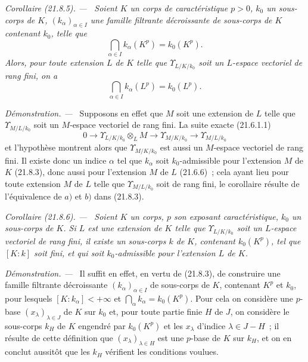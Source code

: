 \documentclass[10pt,oneside]{book}
\makeatletter
\newcommand{\setmanualcurrentlabel}[1]{\def\@currentlabel{#1}}
\newenvironment{corollary}[1][]{%
  \setmanualcurrentlabel{#1}\par\medskip\noindent\itshape Corollaire (#1). ---\ }{\par}
\newenvironment{proof}{%
  \par\medskip\noindent\textit{Démonstration. ---\ }}{\par}
\makeatother
\begin{document}
\begin{corollary}[21.8.5]
\label{0.21.8.5-fr}
Soient $K$ un corps de caractéristique $p>0$, $k_0$ un sous-corps de $K$,
$(k_\alpha)_{\alpha\in I}$ une famille filtrante décroissante de sous-corps
de $K$ contenant $k_0$, telle que
\[
  \bigcap_{\alpha\in I}k_\alpha(K^p)=k_0(K^p).
\]
Alors, pour toute extension $L$ de $K$ telle que $\Upsilon_{L/K/k_0}$ soit
un $L$-espace vectoriel de rang fini, on a
\[
  \bigcap_{\alpha\in I}k_\alpha(L^p)=k_0(L^p).
\]
\end{corollary}

\begin{proof}
Supposons en effet que $M$ soit une extension de $L$ telle que
$\Upsilon_{M/L/k_0}$ soit un $M$-espace vectoriel de rang fini. La suite
exacte (21.6.1.1)
\[
  0\longrightarrow \Upsilon_{L/K/k_0}\otimes_L M
  \longrightarrow \Upsilon_{M/K/k_0}
  \longrightarrow \Upsilon_{M/L/k_0}
\]
et l'hypothèse montrent alors que $\Upsilon_{M/K/k_0}$ est aussi un
$M$-espace vectoriel de rang fini. Il existe donc un indice $\alpha$ tel que
$k_\alpha$ soit $k_0$-admissible pour l'extension $M$ de $K$ (21.8.3), donc
aussi pour l'extension $M$ de $L$ (21.6.6)~; cela ayant lieu pour toute
extension $M$ de $L$ telle que $\Upsilon_{M/L/k_0}$ soit de rang fini, le
corollaire résulte de l'équivalence de $a)$ et $b)$ dans (21.8.3).
\end{proof}

\begin{corollary}[21.8.6]
\label{0.21.8.6-fr}
Soient $K$ un corps, $p$ son exposant caractéristique, $k_0$ un sous-corps de
$K$. Si $L$ est une extension de $K$ telle que $\Upsilon_{L/K/k_0}$ soit un
$L$-espace vectoriel de rang fini, il existe un sous-corps $k$ de $K$,
contenant $k_0(K^p)$, tel que $[K:k]$ soit fini, et qui soit
$k_0$-admissible pour l'extension $L$ de $K$.
\end{corollary}

\begin{proof}
Il suffit en effet, en vertu de (21.8.3), de construire une famille filtrante
décroissante $(k_\alpha)_{\alpha\in I}$ de sous-corps de $K$, contenant
$K^p$ et $k_0$, pour lesquels $[K:k_\alpha]<+\infty$ et
$\bigcap_\alpha k_\alpha=k_0(K^p)$. Pour cela on considère une $p$-base
$(x_\lambda)_{\lambda\in J}$ de $K$ sur $k_0$ et, pour toute partie finie
$H$ de $J$, on considère le sous-corps $k_H$ de $K$ engendré par $k_0(K^p)$
et les $x_\lambda$ d'indice $\lambda\in J-H$~; il résulte de cette définition
que $(x_\lambda)_{\lambda\in H}$ est une $p$-base de $K$ sur $k_H$, et on en
conclut aussitôt que les $k_H$ vérifient les conditions voulues.
\end{proof}
\end{document}
